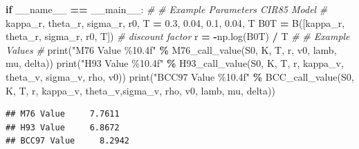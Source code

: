\documentclass[
]{book}
\newenvironment{Shaded}{\begin{snugshade}}{\end{snugshade}}
\newcommand{\BuiltInTok}[1]{#1}
\newcommand{\CommentTok}[1]{\textcolor[rgb]{0.56,0.35,0.01}{\textit{#1}}}
\newcommand{\ControlFlowTok}[1]{\textcolor[rgb]{0.13,0.29,0.53}{\textbf{#1}}}
\newcommand{\FloatTok}[1]{\textcolor[rgb]{0.00,0.00,0.81}{#1}}
\newcommand{\NormalTok}[1]{#1}
\newcommand{\OperatorTok}[1]{\textcolor[rgb]{0.81,0.36,0.00}{\textbf{#1}}}
\newcommand{\SpecialCharTok}[1]{\textcolor[rgb]{0.00,0.00,0.00}{#1}}
\newcommand{\StringTok}[1]{\textcolor[rgb]{0.31,0.60,0.02}{#1}}
\newcommand{\VariableTok}[1]{\textcolor[rgb]{0.00,0.00,0.00}{#1}}
\begin{document}
\begin{Shaded}
\begin{Highlighting}[]
\ControlFlowTok{if} \VariableTok{\_\_name\_\_} \OperatorTok{==} \StringTok{\textquotesingle{}\_\_main\_\_\textquotesingle{}}\NormalTok{:}
  \CommentTok{\#}
  \CommentTok{\# Example Parameters CIR85 Model}
  \CommentTok{\#}
\NormalTok{  kappa\_r, theta\_r, sigma\_r, r0, T }\OperatorTok{=} \FloatTok{0.3}\NormalTok{, }\FloatTok{0.04}\NormalTok{, }\FloatTok{0.1}\NormalTok{, }\FloatTok{0.04}\NormalTok{, T}
\NormalTok{  B0T }\OperatorTok{=}\NormalTok{ B([kappa\_r, theta\_r, sigma\_r, r0, T]) }\CommentTok{\# discount factor}
\NormalTok{  r }\OperatorTok{=} \OperatorTok{{-}}\NormalTok{np.log(B0T) }\OperatorTok{/}\NormalTok{ T}
  \CommentTok{\#}
  \CommentTok{\# Example Values}
  \CommentTok{\#}
  \BuiltInTok{print}\NormalTok{(}\StringTok{"M76 Value }\SpecialCharTok{\%10.4f}\StringTok{"} \OperatorTok{\%}\NormalTok{ M76\_call\_value(S0, K, T, r, v0, lamb, mu, delta))}
  \BuiltInTok{print}\NormalTok{(}\StringTok{"H93 Value }\SpecialCharTok{\%10.4f}\StringTok{"} \OperatorTok{\%}\NormalTok{ H93\_call\_value(S0, K, T, r, kappa\_v, theta\_v, sigma\_v, rho, v0))}
  \BuiltInTok{print}\NormalTok{(}\StringTok{"BCC97 Value }\SpecialCharTok{\%10.4f}\StringTok{"} \OperatorTok{\%}\NormalTok{ BCC\_call\_value(S0, K, T, r, kappa\_v, theta\_v,sigma\_v, rho, v0, lamb, mu, delta))}
\end{Highlighting}
\end{Shaded}

\begin{verbatim}
## M76 Value     7.7611
## H93 Value     6.8672
## BCC97 Value     8.2942
\end{verbatim}

  
\end{document}
